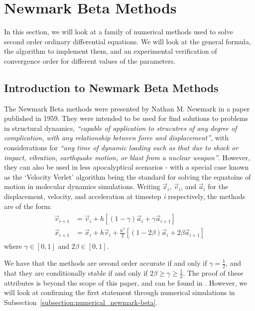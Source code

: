 \documentclass[../Main.tex]{subfiles}
\begin{document}
\section{Newmark Beta Methods}

In this  section, we will look at a family of numerical methods used to solve second order ordinary differential equations. We will look at the general formula, the algorithm to implement them, and an experimental verification of convergence order for different values of the parameters.

\subsection{Introduction to Newmark Beta Methods}\label{subsection:intro_newmark-beta}
The Newmark Beta methods were presented by Nathan M. Newmark in a paper \cite{Newmark1959} published in 1959. They were intended to be used for find solutions to problems in structural dynamics, \textit{``capable of application to strucutres of any degree of complication, with any relationship between force and displacement''}, with considerations for \textit{``any time of dynamic loading such as that due to shock or impact, vibration, earthquake motion, or blast from a nuclear weapon''}. However, they can also be used in less apocalyptical scenarios -  with a special case known as the `Velocity Verlet' algorithm being the standard for solving the equatoins of motion in molecular dynamics simulations.
Writing $\vec{x}_{i}$, $\vec{v}_{i}$, and $\vec{a}_{i}$ for the displacement, velocity, and acceleration at timestep \textit{i} respectively, the methods are of the form:
\begin{align}
	\begin{split}
		\vec{v}_{i+1} & = \vec{v}_{i} + h\left[\left(1-\gamma \right)\vec{a}_{i} + \gamma \vec{a}_{i+1}\right] \\
		\vec{x}_{i+1} & = \vec{x}_{i} + h\vec{v}_{i} + \frac{h^2}{2}\left[ \left(1-2\beta \right)\vec{a}_{i} + 2\beta \vec{a}_{i+1}\right] 
	\end{split} \label{eqn:newmark-beta}
\end{align} where $\gamma \in \left[0, 1 \right]$ and $2\beta \in \left[0, 1 \right]$.  

We have that the methods are second order accurate if and only if $\gamma = \frac{1}{2}$, and that they are conditionally stable if and only if $2\beta \geq \gamma \geq \frac{1}{2}$. The proof of these attributes is beyond the scope of this paper, and can be found in \cite{Newmark1952}. However, we will look at confirming the first statement through numerical simulations in Subsection~\ref{subsection:numerical_newmark-beta}. 
\end{document}
